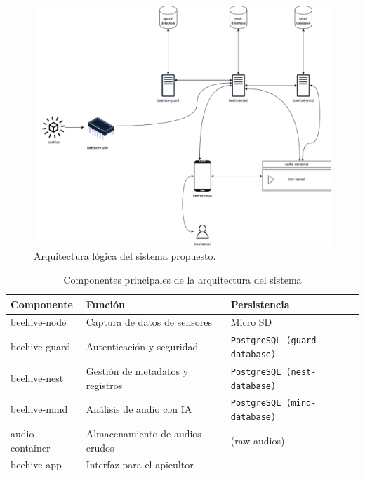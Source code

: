 \begin{figure}[!ht]
    \centering
    \includegraphics[width=\textwidth]{assets/cap_3/architecture_diagram.png}
    \caption{Arquitectura lógica del sistema propuesto.}
    \label{fig:arquitectura_sistema}
\end{figure}

\begin{table}[H]
    \centering
    \caption{Componentes principales de la arquitectura del sistema}
    \begin{tabular}{@{}lll@{}}
        \toprule
        Componente & Función & Persistencia \\ \midrule
        beehive-node & Captura de datos de sensores & Micro SD \\
        beehive-guard & Autenticación y seguridad & \texttt{PostgreSQL (guard-database)} \\
        beehive-nest & Gestión de metadatos y registros & \texttt{PostgreSQL (nest-database)} \\
        beehive-mind & Análisis de audio con IA & \texttt{PostgreSQL (mind-database)} \\
        audio-container & Almacenamiento de audios crudos &  (raw-audios) \\
        beehive-app & Interfaz para el apicultor & -- \\ \bottomrule
    \end{tabular}
    \label{tab:componentes_sistema}
\end{table}